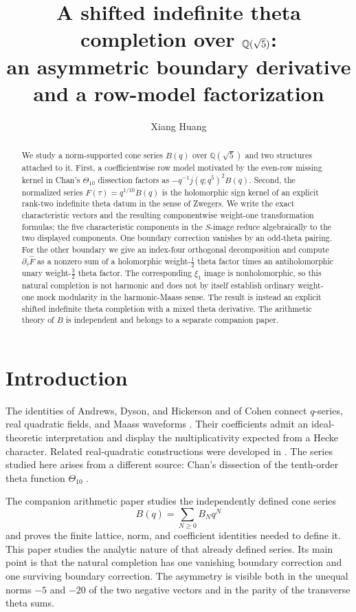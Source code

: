 \documentclass[12pt]{amsart}
\title[A shifted indefinite theta completion over $\QQ(\sqrt5)$]
{A shifted indefinite theta completion over $\QQ(\sqrt5)$:\\
an asymmetric boundary derivative and a row-model factorization}
\author{Xiang Huang}
\date{}
\theoremstyle{definition}
\theoremstyle{remark}
\newcommand{\QQ}{\mathbb{Q}}
\begin{document}
\begin{abstract}
We study a norm-supported cone series $B(q)$ over $\QQ(\sqrt5)$ and
two structures attached to it.  First, a coefficientwise row model
motivated by the even-row missing kernel in Chan's $\Theta_{10}$
dissection factors as $-q^{-1}j(q;q^5)^2B(q)$.  Second, the normalized
series $F(\tau)=q^{1/10}B(q)$ is the holomorphic sign kernel of an
explicit rank-two indefinite theta datum in the sense of Zwegers.  We
write the exact characteristic vectors and the resulting componentwise
weight-one transformation formulas; the five characteristic components in
the $S$-image reduce algebraically to the two displayed components.  One boundary
correction vanishes by an odd-theta pairing.  For the other boundary we give an index-four
orthogonal decomposition and compute
$\partial_{\bar\tau}\widehat F$ as a nonzero sum of a holomorphic
weight-$\tfrac12$ theta factor times an antiholomorphic unary
weight-$\tfrac32$ theta factor.  The corresponding $\xi_1$ image is
nonholomorphic, so this natural completion is not harmonic and does
not by itself establish ordinary weight-one mock modularity in the
harmonic-Maass sense.  The result is instead an explicit shifted indefinite theta
completion with a mixed theta derivative.  The arithmetic theory of
$B$ is independent and belongs to a separate companion paper.
\end{abstract}

\maketitle

\section{Introduction}\label{sec:intro}

The identities of Andrews, Dyson, and Hickerson and of Cohen connect
$q$-series, real quadratic fields, and Maass waveforms
\cite{jADH88,jCo88}.  Their coefficients admit an ideal-theoretic
interpretation and display the multiplicativity expected from a Hecke
character.  Related real-quadratic constructions were developed in
\cite{jCFLZ04,jBrKa11,jLoOs15}.  The series studied here arises from a
different source: Chan's dissection of the tenth-order theta function
$\Theta_{10}$ \cite{jCh10}.

The companion arithmetic paper \cite{companion} studies the independently
defined cone series
\[
  B(q)=\sum_{N\geq 0} B_N q^N
\]
and proves the finite lattice, norm, and coefficient identities needed
to define it.  This paper studies the analytic nature of that already
defined series.  Its main point is that the natural completion has one
vanishing boundary correction and one surviving boundary correction.
The asymmetry is visible both in the unequal norms
$-5$ and $-20$ of the two negative vectors and in the parity of the
transverse theta sums.
\end{document}
